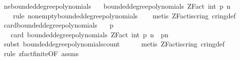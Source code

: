 \begin{isabellebody}
\isadelimproof
\isanewline
%
\endisadelimproof
\isanewline
{}\isamarkupfalse%
\ ne{\isacharunderscore}{\kern0pt}bounded{\isacharunderscore}{\kern0pt}degree{\isacharunderscore}{\kern0pt}polynomials{\isacharcolon}{\kern0pt}\isanewline
\ \ \ {\isachardoublequoteopen}bounded{\isacharunderscore}{\kern0pt}degree{\isacharunderscore}{\kern0pt}polynomials\ {\isacharparenleft}{\kern0pt}ZFact\ {\isacharparenleft}{\kern0pt}int\ p{\isacharparenright}{\kern0pt}{\isacharparenright}{\kern0pt}\ n\ {\isasymnoteq}\ {\isacharbraceleft}{\kern0pt}{\isacharbraceright}{\kern0pt}{\isachardoublequoteclose}\isanewline
%
\isadelimproof
\ \ %
\endisadelimproof
%
\isatagproof
{}\isamarkupfalse%
\ {\isacharparenleft}{\kern0pt}rule\ non{\isacharunderscore}{\kern0pt}empty{\isacharunderscore}{\kern0pt}bounded{\isacharunderscore}{\kern0pt}degree{\isacharunderscore}{\kern0pt}polynomials{\isacharparenright}{\kern0pt}\isanewline
\ \ \isamarkupfalse%
\ {\isacharparenleft}{\kern0pt}metis\ ZFact{\isacharunderscore}{\kern0pt}is{\isacharunderscore}{\kern0pt}cring\ cring{\isacharunderscore}{\kern0pt}def{\isacharparenright}{\kern0pt}%
\endisatagproof
{\isafoldproof}%
%
\isadelimproof
\isanewline
%
\endisadelimproof
\isanewline
{}\isamarkupfalse%
\ card{\isacharunderscore}{\kern0pt}bounded{\isacharunderscore}{\kern0pt}degree{\isacharunderscore}{\kern0pt}polynomials{\isacharcolon}{\kern0pt}\isanewline
\ \ \ {\isachardoublequoteopen}p\ {\isachargreater}{\kern0pt}\ {}{\isachardoublequoteclose}\isanewline
\ \ \ {\isachardoublequoteopen}card\ {\isacharparenleft}{\kern0pt}bounded{\isacharunderscore}{\kern0pt}degree{\isacharunderscore}{\kern0pt}polynomials\ {\isacharparenleft}{\kern0pt}ZFact\ {\isacharparenleft}{\kern0pt}int\ p{\isacharparenright}{\kern0pt}{\isacharparenright}{\kern0pt}\ n{\isacharparenright}{\kern0pt}\ {\isacharequal}{\kern0pt}\ p{\isacharcircum}{\kern0pt}n{\isachardoublequoteclose}\isanewline
%
\isadelimproof
\ \ %
\endisadelimproof
%
\isatagproof
{}\isamarkupfalse%
\ {\isacharparenleft}{\kern0pt}subst\ bounded{\isacharunderscore}{\kern0pt}degree{\isacharunderscore}{\kern0pt}polynomials{\isacharunderscore}{\kern0pt}count{\isacharparenright}{\kern0pt}\isanewline
\ \ \ \ \isamarkupfalse%
\ {\isacharparenleft}{\kern0pt}metis\ ZFact{\isacharunderscore}{\kern0pt}is{\isacharunderscore}{\kern0pt}cring\ cring{\isacharunderscore}{\kern0pt}def{\isacharparenright}{\kern0pt}\isanewline
\ \ \ \isamarkupfalse%
\ {\isacharparenleft}{\kern0pt}rule\ zfact{\isacharunderscore}{\kern0pt}finite{\isacharbrackleft}{\kern0pt}OF\ assms{\isacharbrackright}{\kern0pt}{\isacharparenright}{\kern0pt}\isanewline

\end{isabellebody}
